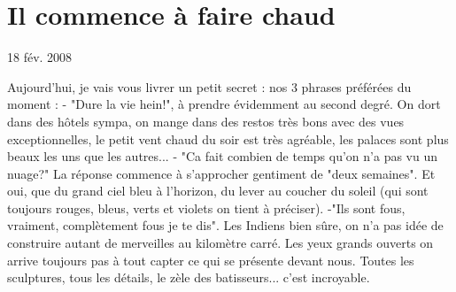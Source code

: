 \section{Il commence à faire chaud}

18 fév. 2008

\begin{multicols}{2}

Aujourd'hui, je vais vous livrer un petit secret : nos 3 phrases préférées du moment :
- "Dure la vie hein!", à prendre évidemment au second degré. On dort dans des hôtels sympa, on mange dans des restos très bons avec des vues exceptionnelles, le petit vent chaud du soir est très agréable, les palaces sont plus beaux les uns que les autres...
- "Ca fait combien de temps qu'on n'a pas vu un nuage?" La réponse commence à s'approcher gentiment de "deux semaines". Et oui, que du grand ciel bleu à l'horizon, du lever au coucher du soleil (qui sont toujours rouges, bleus, verts et violets on tient à préciser).
-"Ils sont fous, vraiment, complètement fous je te dis". Les Indiens bien sûre, on n'a pas idée de construire autant de merveilles au kilomètre carré. Les yeux grands ouverts on arrive toujours pas à tout capter ce qui se présente devant nous. Toutes les sculptures, tous les détails, le zèle des batisseurs... c'est incroyable.


\end{multicols}
